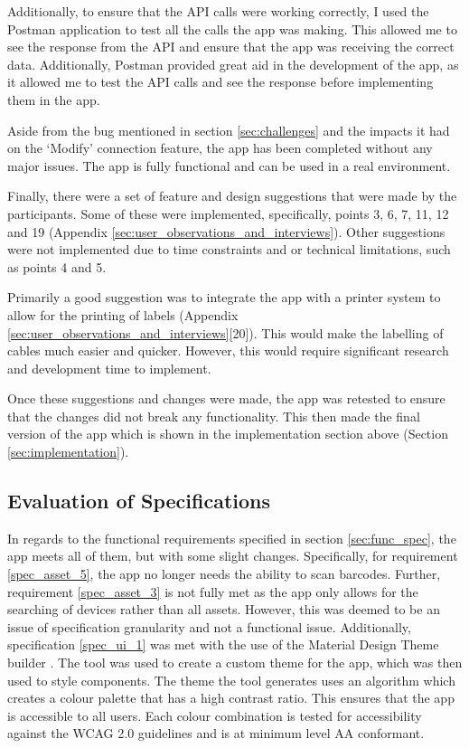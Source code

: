 \documentclass [11pt,a4paper]{article}
\begin{document}
Additionally, to ensure that the API calls were working correctly, I used the Postman application to test all the calls the app was making. This allowed me to see the response from the API and ensure that the app was receiving the correct data. Additionally, Postman provided great aid in the development of the app, as it allowed me to test the API calls and see the response before implementing them in the app.

Aside from the bug mentioned in section \ref{sec:challenges} and the impacts it had on the `Modify' connection feature, the app has been completed without any major issues. The app is fully functional and can be used in a real environment. 

Finally, there were a set of feature and design suggestions that were made by the participants. Some of these were implemented, specifically, points 3, 6, 7, 11, 12 and 19 (Appendix \ref{sec:user_observations_and_interviews}). Other suggestions were not implemented due to time constraints and or technical limitations, such as points 4 and 5. 

Primarily a good suggestion was to integrate the app with a printer system to allow for the printing of labels (Appendix \ref{sec:user_observations_and_interviews}[20]). This would make the labelling of cables much easier and quicker. However, this would require significant research and development time to implement.

Once these suggestions and changes were made, the app was retested to ensure that the changes did not break any functionality. This then made the final version of the app which is shown in the implementation section above (Section \ref{sec:implementation}).

\subsection{Evaluation of Specifications}
\label{sec:eval_specifications}

In regards to the functional requirements specified in section \ref{sec:func_spec}, the app meets all of them, but with some slight changes. Specifically, for requirement \ref{spec_asset_5}, the app no longer needs the ability to scan barcodes. Further, requirement \ref{spec_asset_3} is not fully met as the app only allows for the searching of devices rather than all assets. However, this was deemed to be an issue of specification granularity and not a functional issue. Additionally, specification \ref{spec_ui_1} was met with the use of the Material Design Theme builder \cite{material3ColourTool}. The tool was used to create a custom theme for the app, which was then used to style components. The theme the tool generates uses an algorithm which creates a colour palette that has a high contrast ratio. This ensures that the app is accessible to all users. Each colour combination is tested for accessibility against the WCAG 2.0 guidelines \cite{caldwell2008web} and is at minimum level AA conformant.
\end{document}
